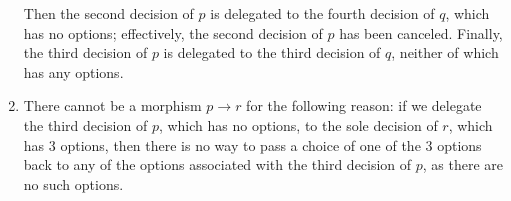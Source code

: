 \documentclass[Book-Poly]{subfiles}
\begin{document}
\begin{exercise}
\begin{solution}
\begin{enumerate}
    Then the second decision of $p$ is delegated to the fourth decision of $q$, which has no options; effectively, the second decision of $p$ has been canceled.
    Finally, the third decision of $p$ is delegated to the third decision of $q$, neither of which has any options.
    \item There cannot be a morphism $p \to r$ for the following reason: if we delegate the third decision of $p$, which has no options, to the sole decision of $r$, which has $3$ options, then there is no way to pass a choice of one of the $3$ options back to any of the options associated with the third decision of $p$, as there are no such options.
\end{enumerate}
\end{solution}
\end{exercise}
\end{document}
